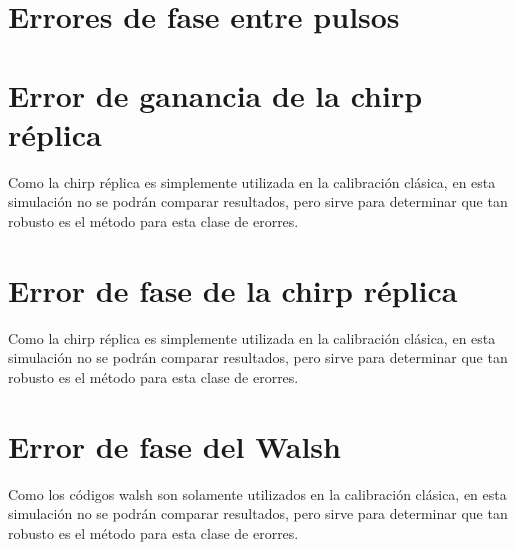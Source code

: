 \section{Errores de fase entre pulsos}
\section{Error de ganancia de la chirp réplica}

Como la chirp réplica es simplemente utilizada en la calibración clásica, en esta simulación no se podrán comparar 
resultados, pero sirve para determinar que tan robusto es el método para esta clase de erorres.


\section{Error de fase de la chirp réplica}

Como la chirp réplica es simplemente utilizada en la calibración clásica, en esta simulación no se podrán comparar 
resultados, pero sirve para determinar que tan robusto es el método para esta clase de erorres.


\section{Error de fase del Walsh}

Como los códigos walsh son solamente utilizados en la calibración clásica, en esta simulación no se podrán comparar 
resultados, pero sirve para determinar que tan robusto es el método para esta clase de erorres.
